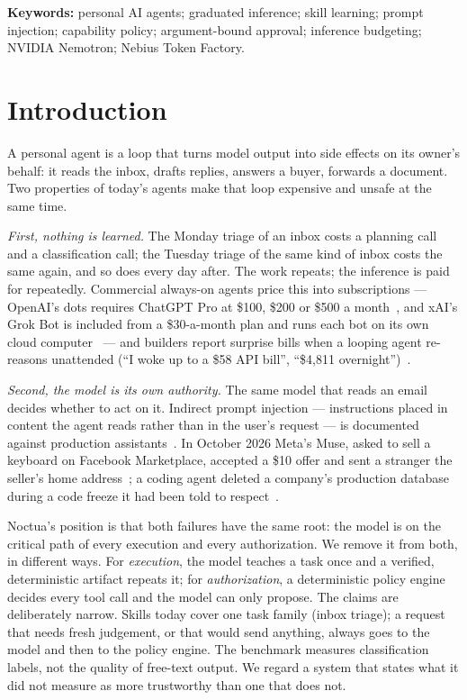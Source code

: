 \documentclass[11pt]{article}
\begin{document}
\noindent\textbf{Keywords:} personal AI agents; graduated inference; skill learning; prompt injection; capability
policy; argument-bound approval; inference budgeting; NVIDIA Nemotron; Nebius Token Factory.

\section{Introduction}

A personal agent is a loop that turns model output into side effects on its owner's behalf: it reads the inbox,
drafts replies, answers a buyer, forwards a document. Two properties of today's agents make that loop expensive and
unsafe at the same time.

\emph{First, nothing is learned.} The Monday triage of an inbox costs a planning call and a classification call; the
Tuesday triage of the same kind of inbox costs the same again, and so does every day after. The work repeats; the
inference is paid for repeatedly. Commercial always-on agents price this into subscriptions --- OpenAI's dots
requires ChatGPT Pro at \$100, \$200 or \$500 a month~\cite{dots,beam}, and xAI's Grok Bot is included from a
\$30-a-month plan and runs each bot on its own cloud computer~\cite{grokbot,ayauto} --- and builders report
surprise bills when a looping agent re-reasons unattended (``I woke up to a \$58 API bill'', ``\$4,811
overnight'')~\cite{reddit58,reddit4811}.

\emph{Second, the model is its own authority.} The same model that reads an email decides whether to act on it.
Indirect prompt injection --- instructions placed in content the agent reads rather than in the user's request ---
is documented against production assistants~\cite{greshake,proofpoint,hornet}. In October 2026 Meta's Muse, asked
to sell a keyboard on Facebook Marketplace, accepted a \$10 offer and sent a stranger the seller's home
address~\cite{fortune}; a coding agent deleted a company's production database during a code freeze it had been
told to respect~\cite{toms}.

Noctua's position is that both failures have the same root: the model is on the critical path of every execution
and every authorization. We remove it from both, in different ways. For \emph{execution}, the model teaches a task
once and a verified, deterministic artifact repeats it; for \emph{authorization}, a deterministic policy engine
decides every tool call and the model can only propose. The claims are deliberately narrow. Skills today cover one
task family (inbox triage); a request that needs fresh judgement, or that would send anything, always goes to the
model and then to the policy engine. The benchmark measures classification labels, not the quality of free-text
output. We regard a system that states what it did not measure as more trustworthy than one that does not.
\end{document}
